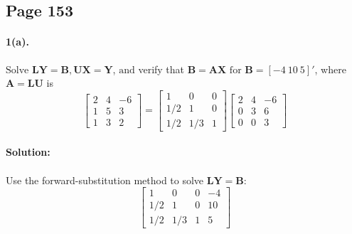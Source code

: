 \documentclass{article}  %
\begin{document}
        \subsection*{Page 153}
        \paragraph{1(a).}$ \mathrm{Solve}$ $\bm{LY = B}, \bm{UX = Y}$, $\mathrm{and}$ verify that $\bm{B = AX}$ $\mathrm{for}$ $\bm{B} = [-4 \ 10 \ 5]'$, where $\bm{A = LU}$ is
        \begin{equation*}       %
            \left[                 %
              \begin{array}{rrr}   %
                2 & 4 & -6 \\
                1 & 5 & 3 \\
                1 & 3 & 2 
              \end{array}
            \right]  \bm=               %
            \left[                 %
              \begin{array}{rrr}   %
                1 & 0 & 0 \\
                1/2 & 1 & 0 \\
                1/2 & 1/3 & 1 
              \end{array}
            \right]
            \left[                 %
              \begin{array}{rrr}   %
                2 & 4 & -6 \\
                0 & 3 & 6 \\
                0 & 0 & 3 
              \end{array}
            \right]
        \end{equation*}
        \paragraph{Solution:}
        \paragraph{}Use the forward-substitution method to solve $\bm{LY = B}$:
        \begin{equation*}       %
            \left[                 %
              \begin{array}{rrr|r}   %
                1 & 0 & 0 & -4\\
                1/2 & 1 & 0 & 10\\
                1/2 & 1/3 & 1 & 5
              \end{array}
            \right]                 %
        \end{equation*}
\end{document}
